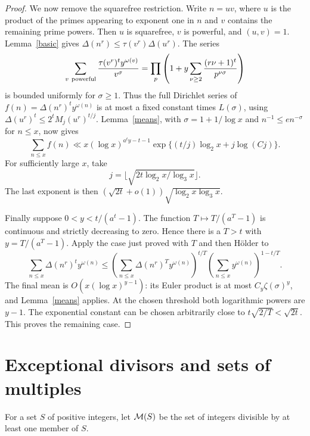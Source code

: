 \documentclass[11pt,a4paper]{article}
\newcommand{\Del}{\Delta}
\newcommand{\om}{\omega}
\begin{document}
\begin{proof}
We now remove the squarefree restriction. Write $n=uv$, where $u$
is the product of the primes appearing to exponent one in $n$ and $v$
contains the remaining prime powers. Then $u$ is squarefree, $v$ is
powerful, and $(u,v)=1$. Lemma~\ref{basic} gives
$\Del(n^r)\le\tau(v^r)\Del(u^r)$.
The series
\[
 \sum_{v\ {\rm powerful}}\frac{\tau(v^r)^t y^{\om(v)}}{v^\sigma}
 =\prod_p\left(1+y\sum_{\nu\ge2}
           \frac{(r\nu+1)^t}{p^{\nu\sigma}}\right)
\]
is bounded uniformly for $\sigma\ge1$. Thus the full Dirichlet series
of $f(n)=\Del(n^r)^t y^{\om(n)}$ is at most a fixed constant times
$L(\sigma)$, using $\Del(u^r)^t\le2^tM_j(u^r)^{t/j}$.
Lemma~\ref{means}, with $\sigma=1+1/\log x$ and
$n^{-1}\le e n^{-\sigma}$ for $n\le x$, now gives
\[
 \sum_{n\le x} f(n)\ll
 x(\log x)^{a^ty-t-1}
 \exp\{(t/j)\log_2x+j\log(Cj)\}.
\]
For sufficiently large $x$, take
\[
 j=\lfloor\sqrt{2t\log_2x/\log_3x}\rfloor.
\]
The last exponent is then
$(\sqrt{2t}+o(1))\sqrt{\log_2x\log_3x}$.

Finally suppose $0<y<t/(a^t-1)$. The function $T\mapsto T/(a^T-1)$
is continuous and strictly decreasing to zero. Hence there is a $T>t$
with $y=T/(a^T-1)$.
Apply the case just proved with $T$ and then H\"older to
\[
 \sum_{n\le x}\Del(n^r)^t y^{\om(n)}
 \le\left(\sum_{n\le x}\Del(n^r)^T y^{\om(n)}\right)^{t/T}
       \left(\sum_{n\le x}y^{\om(n)}\right)^{1-t/T}.
\]
The final mean is $O(x(\log x)^{y-1})$: its Euler product is at most
$C_y\zeta(\sigma)^y$, and Lemma~\ref{means} applies. At the chosen
threshold both logarithmic powers are $y-1$. The exponential constant
can be chosen arbitrarily close to $t\sqrt{2/T}<\sqrt{2t}$.
This proves the remaining case.
\end{proof}

\section{Exceptional divisors and sets of multiples}
For a set $S$ of positive integers, let ${\cal M}(S)$ be the set of
integers divisible by at least one member of $S$.
\end{document}
